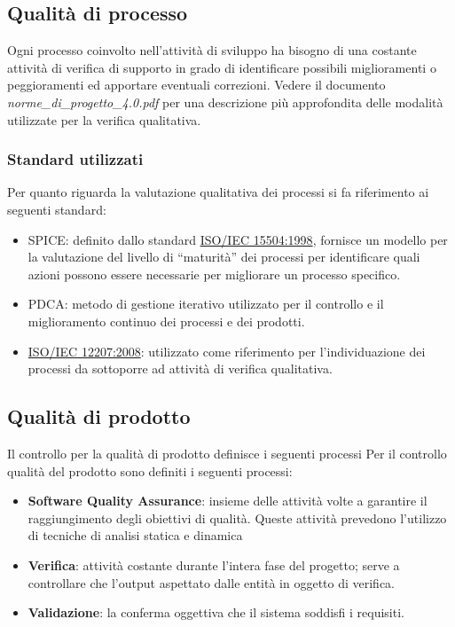 \documentclass[a4paper,11pt]{article}
\begin{document}
\subsection{Qualità di processo}

Ogni processo coinvolto nell'attività di sviluppo ha bisogno di una costante attività di verifica di supporto in grado di identificare possibili miglioramenti o peggioramenti ed apportare eventuali correzioni. Vedere il documento \textit{norme\_di\_progetto\_4.0.pdf} per una descrizione più approfondita delle modalità utilizzate per la verifica qualitativa.\\

\subsubsection{Standard utilizzati}
Per quanto riguarda la valutazione qualitativa dei processi si fa riferimento ai seguenti standard: 
\begin{itemize}
\item SPICE\addglos : definito dallo standard \underline{ISO/IEC 15504:1998}, fornisce un modello per la valutazione del livello di “maturità”
dei processi per identificare quali azioni possono essere necessarie per migliorare un processo specifico.
\item PDCA\addglos : metodo di gestione iterativo utilizzato per il controllo e il miglioramento continuo dei processi e dei prodotti.
\item \underline{ISO/IEC 12207:2008}: utilizzato come riferimento per l'individuazione dei processi da sottoporre ad attività di verifica qualitativa.
\end{itemize}


\subsection{Qualità di prodotto}
Il controllo per la qualità di prodotto definisce i seguenti processi
Per il controllo qualità del prodotto sono definiti i seguenti processi:
\begin{itemize}
\item \textbf{Software Quality Assurance}: insieme delle attività volte a garantire il raggiungimento degli obiettivi di qualità. Queste attività prevedono l'utilizzo di tecniche di analisi statica e dinamica
\item \textbf{Verifica}: attività costante durante l'intera fase del progetto; serve a controllare che l'output aspettato dalle entità in oggetto di verifica.
\item \textbf{Validazione}: la conferma oggettiva che il sistema soddisfi i requisiti. 
\end{itemize}
\end{document}
